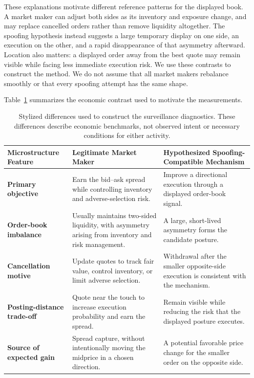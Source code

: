 \documentclass[11pt]{article}
\begin{document}
These explanations motivate different reference patterns for the displayed book. A market maker can adjust both sides as its inventory and exposure change, and may replace cancelled orders rather than remove liquidity altogether. The spoofing hypothesis instead suggests a large temporary display on one side, an execution on the other, and a rapid disappearance of that asymmetry afterward. Location also matters: a displayed order away from the best quote may remain visible while facing less immediate execution risk. We use these contrasts to construct the method. We do not assume that all market makers rebalance smoothly or that every spoofing attempt has the same shape.

Table~\ref{tab:surveillance-models} summarizes the economic contrast used to motivate the measurements.
\begin{table}[htbp]
\centering
\caption{Stylized differences used to construct the surveillance diagnostics. These differences describe economic
benchmarks, not observed intent or necessary conditions for either activity.}
\label{tab:surveillance-models}
\renewcommand{\arraystretch}{1.4}
\setlength{\tabcolsep}{8pt}

\begin{tabularx}{\textwidth}{
    >{\raggedright\arraybackslash\bfseries}p{}
    >{\raggedright\arraybackslash}X
    >{\raggedright\arraybackslash}X
}
\toprule
\rowcolor{gray!15}
\textbf{Microstructure Feature} & \textbf{Legitimate Market Maker} & \textbf{Hypothesized Spoofing-Compatible Mechanism} \\
\midrule
Primary objective
& Earn the bid--ask spread while controlling inventory and adverse-selection risk.
& Improve a directional execution through a displayed order-book signal. \\

Order-book imbalance
& Usually maintains two-sided liquidity, with asymmetry arising from inventory and risk management.
& A large, short-lived asymmetry forms the candidate posture. \\

Cancellation motive
& Update quotes to track fair value, control inventory, or limit adverse selection.
& Withdrawal after the smaller opposite-side execution is consistent with the mechanism. \\

Posting-distance trade-off
& Quote near the touch to increase execution probability and earn the spread.
& Remain visible while reducing the risk that the displayed posture executes. \\

Source of expected gain
& Spread capture, without intentionally moving the midprice in a chosen direction.
& A potential favorable price change for the smaller order on the opposite side. \\
\bottomrule
\end{tabularx}
\end{table}
\end{document}
